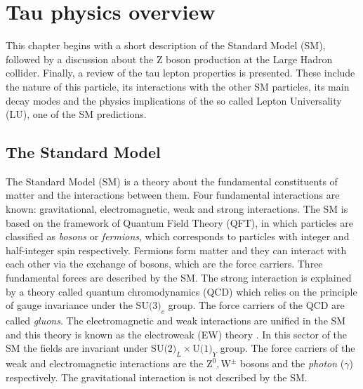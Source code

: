 \chapter{Tau physics overview}\label{chap:relatedwork}
This chapter begins with a short description of the Standard Model (SM), followed by a discussion about the Z boson production at the Large Hadron collider. Finally, a review of the tau lepton properties is presented. These include the nature of this particle, its interactions with the other SM particles, its main decay modes and the physics implications of the so called Lepton Universality (LU), one of the SM predictions.  
\section{The Standard Model}\label{chap2secm1}
The Standard Model (SM) is a theory about the fundamental constituents of matter and the interactions between them. Four fundamental interactions are known: gravitational, electromagnetic, weak and strong interactions. The SM is based on the framework of Quantum Field Theory (QFT), in which particles are classified as \textit{bosons} or \textit{fermions}, which corresponds to particles with integer and half-integer spin respectively. Fermions form matter and they can interact with each other via the exchange of bosons, which are the force carriers. Three fundamental forces are described by the SM. The strong interaction is explained by a theory called quantum chromodynamics (QCD) \cite{GellMann:1964nj} which relies on the principle of gauge invariance under the $\text{SU(3)}_c$ group. The force carriers of the QCD are called \textit{gluons}. The electromagnetic and weak interactions are unified in the SM and this theory is known as the electroweak (EW) theory \cite{Glashow:1967rx,Salam:1968rm,Weinberg:1967tq}. In this sector of the SM the fields are invariant under $\text{SU(2)}_L\times\text{U(1)}_Y$ group. The force carriers of the weak and electromagnetic interactions are the $\text{Z}^0,\text{W}^\pm$ bosons and the \textit{photon} ($\gamma$) respectively. The gravitational interaction is not described by the SM.
	
